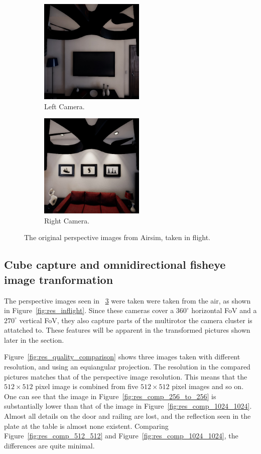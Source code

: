 \begin{figure}[!htb]
\begin{subfigure}{0.32\textwidth}
        \centering
        \includegraphics[height=5cm]{rapport/fig/Results/single/left_center.jpeg}
        \caption{Left Camera.}
        \label{fig:res_original_left}
    \end{subfigure}
    \begin{subfigure}{0.32\textwidth}
        \centering
        \includegraphics[height=5cm]{rapport/fig/Results/single/right_center.jpeg}
        \caption{Right Camera.}
        \label{fig:res_original_right}
    \end{subfigure}
    \centering
    \caption{The original perspective images from Airsim, taken in flight.}
    \label{fig:res_original_pictures}
\end{figure}

\subsection{Cube capture and omnidirectional fisheye image tranformation}

The perspective images seen in ~\ref{fig:res_original_pictures} were taken were taken from the air, as shown in Figure~\ref{fig:res_inflight}. Since these cameras cover a $360^\circ$ horizontal FoV and a $270^\circ$ vertical FoV, they also capture parts of the multirotor the camera cluster is attatched to. These features will be apparent in the transformed pictures shown later in the section.

Figure~\ref{fig:res_quality_comparison} shows three images taken with different resolution, and using an equiangular projection. The resolution in the compared pictures matches that of the perspective image resolution. This means that the $512\times512$ pixel image is combined from five $512\times512$ pixel images and so on. One can see that the image in Figure~\ref{fig:res_comp_256_to_256} is substantially lower than that of the image in Figure~\ref{fig:res_comp_1024_1024}. Almost all details on the door and railing are lost, and the reflection seen in the plate at the table is almost none existent. Comparing Figure~\ref{fig:res_comp_512_512} and Figure~\ref{fig:res_comp_1024_1024}, the differences are quite minimal.

